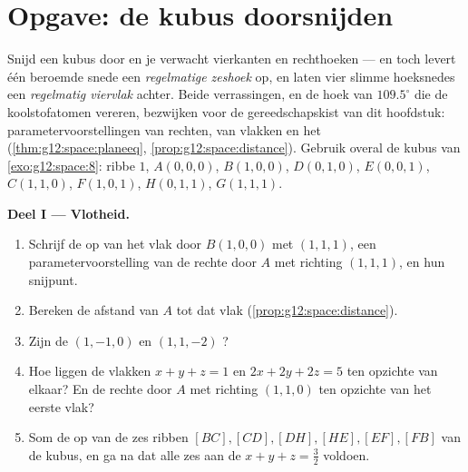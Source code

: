\section{Opgave: de kubus doorsnijden}

\begin{problem}
\label{pb:g12:space:1}
Snijd een kubus door en je verwacht vierkanten en rechthoeken --- en toch
levert één beroemde snede een \emph{regelmatige zeshoek} op, en laten vier
slimme hoeksnedes een \emph{regelmatig viervlak} achter. Beide verrassingen,
en de hoek van $109.5^\circ$ die de koolstofatomen vereren, bezwijken voor de
gereedschapskist van dit hoofdstuk: parametervoorstellingen van rechten,
 van vlakken en het 
(\cref{thm:g12:space:planeeq}, \cref{prop:g12:space:distance}). Gebruik overal
de kubus van \cref{exo:g12:space:8}: ribbe $1$, $A(0,0,0)$, $B(1,0,0)$,
$D(0,1,0)$, $E(0,0,1)$, $C(1,1,0)$, $F(1,0,1)$, $H(0,1,1)$, $G(1,1,1)$.

\medskip
\noindent\textbf{Deel I --- Vlotheid.}
\begin{enumerate}
  \item Schrijf de  op van het vlak door $B(1,0,0)$ met
         $(1,1,1)$, een parametervoorstelling van de rechte door
        $A$ met richting $(1,1,1)$, en hun snijpunt.
  \item Bereken de afstand van $A$ tot dat vlak
        (\cref{prop:g12:space:distance}).
  \item Zijn de  $(1,-1,0)$ en $(1,1,-2)$ ?
  \item Hoe liggen de vlakken $x + y + z = 1$ en $2x + 2y + 2z = 5$ ten
        opzichte van elkaar? En de rechte door $A$ met richting $(1,1,0)$ ten
        opzichte van het eerste vlak?
  \item Som de  op van de zes ribben $[BC], [CD], [DH], [HE], [EF],
        [FB]$ van de kubus, en ga na dat alle zes aan de 
        $x + y + z = \frac32$ voldoen.
\end{enumerate}


\end{problem}
